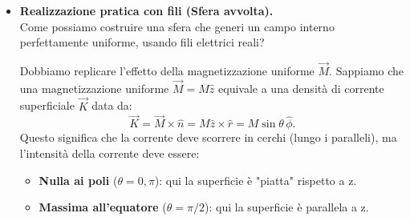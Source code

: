 \documentclass{book}
\begin{document}
\begin{itemize}
  \textbf{Analogia Elettrostatica.} \\
  Esiste una perfetta corrispondenza formale con una sfera dielettrica polarizzata uniformemente (\(\vec{P}\)). Le "cariche magnetiche" superficiali sono \(\sigma_m = \vec{M}\cdot\hat{n} = M \cos\theta\).
  Possiamo quindi trascrivere le soluzioni note del campo elettrico sostituendo le variabili:
  \[
  \vec{E} \to \vec{H}, \quad \vec{P} \to \vec{M}, \quad \frac{1}{\varepsilon_0} \to 1 \text{ (nel sistema SI per i potenziali)}.
  \]

  \textbf{Campo esterno (Dipolo).} \\
  All'esterno, la sfera si comporta come un dipolo puntiforme \(\vec{m} = \frac{4}{3}\pi R^3 \vec{M}\) posto al centro. Il campo \(\vec{H}\) è:
  \[
  \vec{H}_{\text{est}} = \frac{1}{4\pi} \left( \frac{3(\vec{m}\cdot\hat{r})\hat{r} - \vec{m}}{r^3} \right).
  \]
  Poiché all'esterno \(\vec{M}=0\), si ha \(\vec{B} = \mu_0 \vec{H}\), quindi:
  \[
  \vec{B}_{\text{est}} = \frac{\mu_0}{4\pi} \left( \frac{3(\vec{m}\cdot\hat{r})\hat{r} - \vec{m}}{r^3} \right).
  \]

  \textbf{Campo interno (Uniforme).} \\
  Per una sfera polarizzata, il campo elettrico interno è depolarizzante: \(\vec{E}_{\text{int}} = -\frac{\vec{P}}{3\varepsilon_0}\).
  Analogamente, il campo magnetico \(\vec{H}\) interno è demagnetizzante:
  \[
  \vec{H}_{\text{int}} = -\frac{\vec{M}}{3}.
  \]
  Per trovare l'induzione \(\vec{B}\), usiamo la relazione costitutiva:
  \[
  \vec{B}_{\text{int}} = \mu_0 (\vec{H}_{\text{int}} + \vec{M}) = \mu_0 \left( -\frac{\vec{M}}{3} + \vec{M} \right).
  \]
  Svolgendo la somma vettoriale:
  \[
  \vec{B}_{\text{int}} = \mu_0 \vec{M} \left( 1 - \frac{1}{3} \right) = \frac{2}{3} \mu_0 \vec{M}.
  \]
  
  \item \textbf{Realizzazione pratica con fili (Sfera avvolta).} \\
  Come possiamo costruire una sfera che generi un campo interno perfettamente uniforme, usando fili elettrici reali?
  
  Dobbiamo replicare l'effetto della magnetizzazione uniforme \(\vec{M}\).
  Sappiamo che una magnetizzazione uniforme \(\vec{M}=M\hat{z}\) equivale a una densità di corrente superficiale \(\vec{K}\) data da:
  \[
  \vec{K} = \vec{M} \times \hat{n} = M\hat{z} \times \hat{r} = M \sin\theta \, \hat{\phi}.
  \]
  Questo significa che la corrente deve scorrere in cerchi (lungo i paralleli), ma l'intensità della corrente deve essere:
  \begin{itemize}
      \item \textbf{Nulla ai poli} (\(\theta=0, \pi\)): qui la superficie è "piatta" rispetto a z.
      \item \textbf{Massima all'equatore} (\(\theta=\pi/2\)): qui la superficie è parallela a z.
  \end{itemize}
  

\end{itemize}
\end{document}
